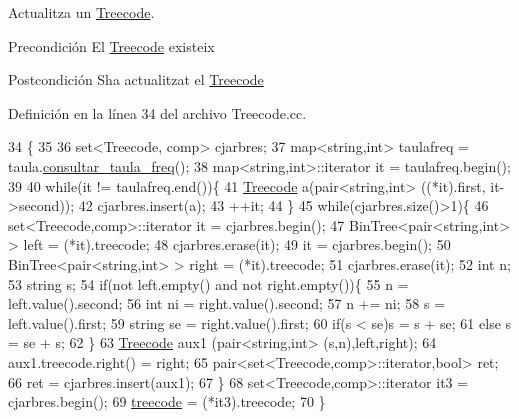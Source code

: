 Actualitza un \hyperlink{class_treecode}{Treecode}. 

\begin{DoxyPrecond}{Precondición}
El \hyperlink{class_treecode}{Treecode} existeix 
\end{DoxyPrecond}
\begin{DoxyPostcond}{Postcondición}
S\textquotesingle{}ha actualitzat el \hyperlink{class_treecode}{Treecode} 
\end{DoxyPostcond}


Definición en la línea 34 del archivo Treecode.\+cc.


\begin{DoxyCode}
34                                                         \{
35     
36     set<Treecode, comp> cjarbres;
37     map<string,int> taulafreq = taula.\hyperlink{class_taula__de__freq_a438f3ce025ca433420891fead5affae4}{consultar\_taula\_freq}();
38     map<string,int>::iterator it = taulafreq.begin();
39     
40     \textcolor{keywordflow}{while}(it != taulafreq.end())\{
41         \hyperlink{class_treecode}{Treecode} a(pair<string,int> ((*it).first, it->second));
42         cjarbres.insert(a);
43         ++it;
44     \}
45     \textcolor{keywordflow}{while}(cjarbres.size()>1)\{
46         set<Treecode,comp>::iterator it = cjarbres.begin();
47         BinTree<pair<string,int> > left = (*it).treecode;
48         cjarbres.erase(it);
49         it = cjarbres.begin();
50         BinTree<pair<string,int> > right = (*it).treecode;
51         cjarbres.erase(it);
52         \textcolor{keywordtype}{int} n;
53         \textcolor{keywordtype}{string} s;
54         \textcolor{keywordflow}{if}(not left.empty() and not right.empty())\{
55             n = left.value().second;
56             \textcolor{keywordtype}{int} ni = right.value().second;
57             n += ni;
58             s = left.value().first;
59             \textcolor{keywordtype}{string} se = right.value().first;
60             \textcolor{keywordflow}{if}(s < se)s = s + se;
61             \textcolor{keywordflow}{else} s = se + s;
62         \}
63         \hyperlink{class_treecode}{Treecode} aux1 (pair<string,int> (s,n),left,right);
64         aux1.treecode.right() = right;
65         pair<set<Treecode,comp>::iterator,\textcolor{keywordtype}{bool}> ret;
66         ret = cjarbres.insert(aux1);
67     \}
68     set<Treecode,comp>::iterator it3 = cjarbres.begin();
69     \hyperlink{class_treecode_abd4467b0a13a57fcd3bddf4a60853372}{treecode} = (*it3).treecode;
70 \}
\end{DoxyCode}
\mbox{\label{class_treecode_a781e52014473e0a905763a6a537cc2aa}} 
